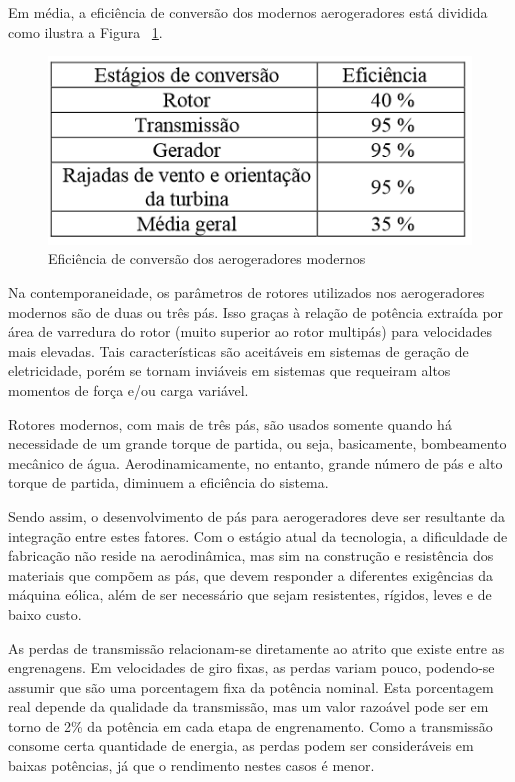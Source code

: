    Em média, a eficiência de conversão dos modernos aerogeradores está dividida como ilustra a Figura ~\ref{eficiencia_conversao_aerogeradores}.
    
    \begin{figure}[!ht]
    \centering
    \includegraphics[scale=0.7]{editaveis/figuras/eficiencia_conversao_aerogeradores}
    \caption{Eficiência de conversão dos aerogeradores modernos}
    \label{eficiencia_conversao_aerogeradores}
    \end{figure}
    
    Na contemporaneidade, os parâmetros de rotores utilizados nos aerogeradores modernos são de duas ou três pás.
    Isso graças à relação de potência extraída por área de varredura do rotor (muito superior ao rotor multipás) para 
    velocidades mais elevadas. Tais características são aceitáveis em sistemas de geração de eletricidade, porém se tornam
    inviáveis em sistemas que requeiram altos momentos de força e/ou carga variável.
    
    Rotores modernos, com mais de três pás, são usados somente quando há necessidade de um grande torque de partida, ou seja, 
    basicamente, bombeamento mecânico de água. Aerodinamicamente, no entanto, grande número de pás e alto torque de partida,
    diminuem a eficiência do sistema. 

    Sendo assim, o desenvolvimento de pás para aerogeradores deve ser resultante da integração entre estes fatores.
    Com o estágio atual da tecnologia, a dificuldade de fabricação não reside na aerodinâmica, mas sim na construção
    e resistência dos materiais que compõem as pás, que devem responder a diferentes exigências da máquina eólica,
    além de ser necessário que sejam resistentes, rígidos, leves e de baixo custo.
    
    As perdas de transmissão relacionam-se diretamente ao atrito que existe entre as engrenagens.
    Em velocidades de giro fixas, as perdas variam pouco, podendo-se assumir que são uma porcentagem fixa
    da potência nominal. Esta porcentagem real depende da qualidade da transmissão, mas um valor razoável
    pode ser em torno de 2\% da potência em cada etapa de engrenamento. Como a transmissão consome certa quantidade de
    energia, as perdas podem ser consideráveis em baixas potências, já que o rendimento nestes casos é menor.
    
